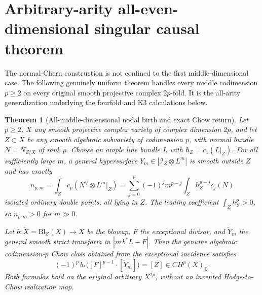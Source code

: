 \documentclass[11pt]{article}
\newtheorem{theorem}{Theorem}
\begin{document}
\section{Arbitrary-arity all-even-dimensional singular causal theorem}
The normal-Chern construction is not confined to the first
middle-dimensional case. The following genuinely uniform theorem
handles every middle codimension $p\ge2$ on every original
smooth projective complex $2p$-fold. It is the all-arity
generalization underlying the fourfold and K3 calculations below.

\begin{theorem}[All-middle-dimensional nodal birth and exact Chow return]
Let $p\ge2$, $X$ any smooth projective complex variety of
complex dimension $2p$, and let $Z\subset X$ be any smooth
algebraic subvariety of codimension $p$, with normal bundle
$N=N_{Z/X}$ of rank $p$. Choose an ample line bundle $L$
with $h_Z=c_1(L|_Z)$. For all sufficiently large $m$, a
general hypersurface $Y_m\in|\mathcal I_Z\otimes L^m|$
is smooth outside $Z$ and has exactly
\[
 \boxed{
 n_{p,m}=\int_Z c_p(N^\vee\otimes L^m|_Z)
 =\sum_{j=0}^p(-1)^j m^{p-j}
                  \int_Z h_Z^{p-j}c_j(N)
 }                                                     \tag{13}
\]
isolated ordinary double points, all lying in $Z$.
The leading coefficient $\int_Zh_Z^p>0$, so
$n_{p,m}>0$ for $m\gg0$.

Let $b:\widetilde X=\mathrm{Bl}_Z(X)\to X$ be the blowup,
$F$ the exceptional divisor, and $\widetilde Y_m$ the
general smooth strict transform in
$|m\,b^*L-F|$. Then the \emph{genuine algebraic
codimension-$p$ Chow class} obtained from the
exceptional incidence satisfies
\[
 \boxed{
 (-1)^p\,b_*\bigl([F]^{p-1}\cdot[\widetilde Y_m]\bigr)
       =[Z]\in CH^p(X)_{\mathbb Q}.
 }                                                     \tag{14}
\]
Both formulas hold on the original arbitrary $X^{2p}$,
without an invented Hodge-to-Chow realization map.
\end{theorem}
\end{document}
